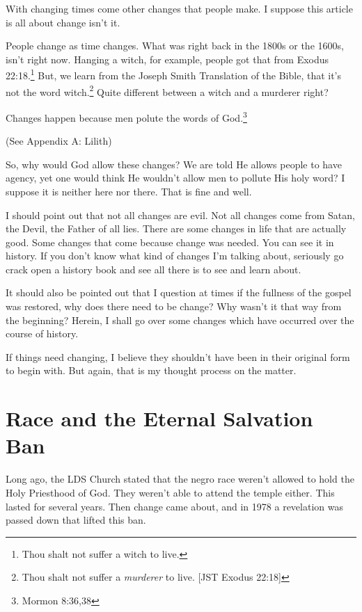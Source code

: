 \documentclass{article}
\begin{document}
With changing times come other changes that people make. I suppose this article 
is all about change isn't it.

People change as time changes. What was right back in the 1800s or the 1600s, 
isn't right now. Hanging a witch, for example, people got that from Exodus 
22:18.\footnote{Thou shalt not suffer a witch to live.} But, we learn from the 
Joseph Smith Translation of the Bible, that it's not the word 
witch.\footnote{Thou shalt not suffer a \textit{murderer} to live. 
[JST Exodus 22:18]} Quite different between a witch and a murderer right?

Changes happen because men polute the words of God.\footnote{Mormon 8:36,38}

(See Appendix A: Lilith)

So, why would God allow these changes? We are told He allows people to have
agency, yet one would think He wouldn't allow men to pollute His holy word?
I suppose it is neither here nor there. That is fine and well.

I should point out that not all changes are evil. Not all changes come from 
Satan, the Devil, the Father of all lies. There are some changes in life that 
are actually good. Some changes that come because change was needed. You can see 
it in history. If you don't know what kind of changes I'm talking about, 
seriously go crack open a history book and see all there is to see and learn 
about.

It should also be pointed out that I question at times if the fullness of the 
gospel was restored, why does there need to be change? Why wasn't it that way 
from the beginning? Herein, I shall go over some changes which have occurred
over the course of history.

If things need changing, I believe they shouldn't have been in their original
form to begin with. But again, that is my thought process on the matter.

\newpage

\section{Race and the Eternal Salvation Ban}

Long ago, the LDS Church stated that the negro race weren't allowed to hold the 
Holy Priesthood of God. They weren't able to attend the temple either. This 
lasted for several years. Then change came about, and in 1978 a revelation was 
passed down that lifted this ban.
\end{document}
